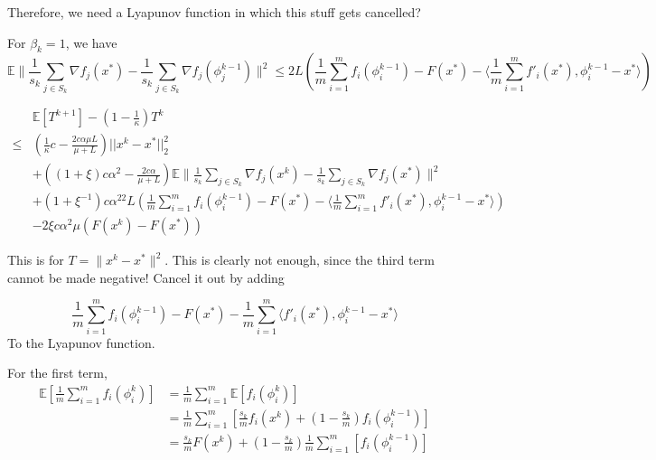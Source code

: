 \documentclass[12pt]{article}
\begin{document}
				Therefore, we need a Lyapunov function in which this stuff gets cancelled? 
		
		
				For $\beta_k=1$, we have 
				\begin{equation}
					\mathbb{E} \| \frac{1 }{s_k} \sum_{j \in S_k}  \nabla f_j(x^*) -\frac{1 }{s_k} \sum_{j \in S_k}  \nabla f_j(\phi^{k-1}_j)\|^2  \leq 2L(\frac{1}{m}\sum_{i =1}^{m}  f_i(\phi_i^{k-1})   - F(x^*)  -  \langle \frac{1 }{m} \sum_{i =1}^{m}   f'_i(x^*), \phi_i^{k-1} - x^*\rangle)
				\end{equation}
		
		
					\begin{align*}
						&\mathbb{E}\left[ T^{k+1} \right] - \left(1-\frac{1}{\kappa} \right) T^k \\
						\leq  &(\frac{1}{\kappa} c-\frac{2c \alpha \mu L}{\mu+L})||x^k-x^*||_2^2 \\
					&+ ((1+\xi)c \alpha^2 - \frac{2c \alpha }{\mu+L})\mathbb{E} \| \frac{1}{s_k} \sum_{j \in S_k}   \nabla f_j(x^k) -\frac{1}{s_k} \sum_{j \in S_k}   \nabla f_j(x^*) \|^2\\
					&+(1+\xi^{-1})c \alpha^22L(\frac{1}{m}\sum_{i =1}^{m}  f_i(\phi_i^{k-1})   - F(x^*)  -  \langle \frac{1 }{m} \sum_{i =1}^{m}   f'_i(x^*), \phi_i^{k-1} - x^*\rangle) \\
				&- 2 \xi c \alpha^2 \mu (F(x^k) - F(x^*))
						\end{align*}
		
				This is for $T = \|x^k-x^*\|^2$. This is clearly not enough, since the third term cannot be made negative! Cancel it out by adding
		
				\begin{equation}
					 \frac{1}{m} \sum_{i =1}^{m} f_i(\phi_i^{k-1}) - F(x^*) - \frac{1}{m}  \sum_{i =1}^{m} \langle f'_i(x^*), \phi_i^{k-1} - x^*\rangle 
				\end{equation}
				To the Lyapunov function. 

				For the first term,
				\begin{align*}
				\mathbb{E} \left[ \frac{1}{m} \sum_{i =1}^{m} f_i(\phi_i^{k}) \right] & =\frac{1}{m} \sum_{i =1}^{m} \mathbb{E} \left[ f_i(\phi_i^{k}) \right] \\
				& = \frac{1}{m} \sum_{i =1}^{m} \left[ \frac{s_k}{m}  f_i(x^k) + \left(1 - \frac{s_k}{m} \right ) f_i(\phi_i^{k-1}) \right]\\
				& = \frac{s_k}{m}  F(x^k) + \left(1 - \frac{s_k}{m} \right )\frac{1}{m} \sum_{i =1}^{m} \left[  f_i(\phi_i^{k-1}) \right]\\
				\end{align*}
\end{document}
